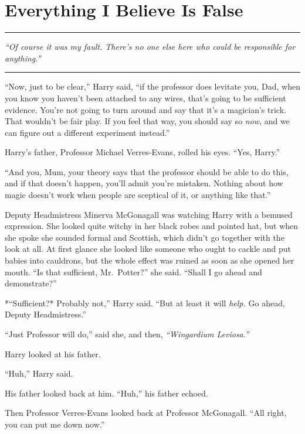\chapter{Everything I Believe Is
False}\label{everything-i-believe-is-false}

\begin{center}\rule{3in}{0.4pt}\end{center}

\emph{``Of course it was my fault. There's no one else here who could be
responsible for anything.''}

\begin{center}\rule{3in}{0.4pt}\end{center}

``Now, just to be clear,'' Harry said, ``if the professor does levitate
you, Dad, when you know you haven't been attached to any wires, that's
going to be sufficient evidence. You're not going to turn around and say
that it's a magician's trick. That wouldn't be fair play. If you feel
that way, you should say so \emph{now}, and we can figure out a
different experiment instead.''

Harry's father, Professor Michael Verres-Evans, rolled his eyes. ``Yes,
Harry.''

``And you, Mum, your theory says that the professor should be able to do
this, and if that doesn't happen, you'll admit you're mistaken. Nothing
about how magic doesn't work when people are sceptical of it, or
anything like that.''

Deputy Headmistress Minerva McGonagall was watching Harry with a bemused
expression. She looked quite witchy in her black robes and pointed hat,
but when she spoke she sounded formal and Scottish, which didn't go
together with the look at all. At first glance she looked like someone
who ought to cackle and put babies into cauldrons, but the whole effect
was ruined as soon as she opened her mouth. ``Is that sufficient,
Mr.~Potter?'' she said. ``Shall I go ahead and demonstrate?''

*``Sufficient?* Probably not,'' Harry said. ``But at least it will
\emph{help.} Go ahead, Deputy Headmistress.''

``Just Professor will do,'' said she, and then, \emph{``Wingardium
Leviosa.''}

Harry looked at his father.

``Huh,'' Harry said.

His father looked back at him. ``Huh,'' his father echoed.

Then Professor Verres-Evans looked back at Professor McGonagall. ``All
right, you can put me down now.''

